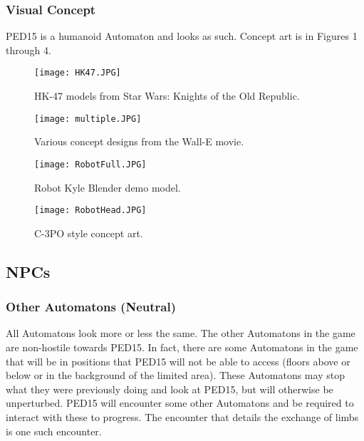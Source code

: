 \documentclass[journal]{IEEEtran}
\begin{document}
\subsubsection{Visual Concept}
PED15 is a humanoid Automaton and looks as such. Concept art is in Figures 1 through 4.
	\begin{figure}[h]
		\hfill\texttt{[image: HK47.JPG]}\hspace*{\fill}
		\caption{HK-47 models from Star Wars: Knights of the Old Republic.}
	\end{figure}
	\begin{figure}[h]
		\hfill\texttt{[image: multiple.JPG]}\hspace*{\fill}
		\caption{Various concept designs from the Wall-E movie.}
	\end{figure}
	\begin{figure}[h]
		\hfill\texttt{[image: RobotFull.JPG]}\hspace*{\fill}
		\caption{Robot Kyle Blender demo model.}
	\end{figure}
	\begin{figure}[h]
		\hfill\texttt{[image: RobotHead.JPG]}\hspace*{\fill}
		\caption{C-3PO style concept art.}
	\end{figure}
\subsection{NPCs}
\subsubsection{Other Automatons (Neutral)}
All Automatons look more or less the same. The other Automatons in the game are non-hostile towards PED15. In fact, there are some Automatons in the game that will be in positions that PED15 will not be able to access (floors above or below or in the background of the limited area). These Automatons may stop what they were previously doing and look at PED15, but will otherwise be unperturbed. PED15 will encounter some other Automatons and be required to interact with these to progress. The encounter that details the exchange of limbs is one such encounter.
\end{document}
